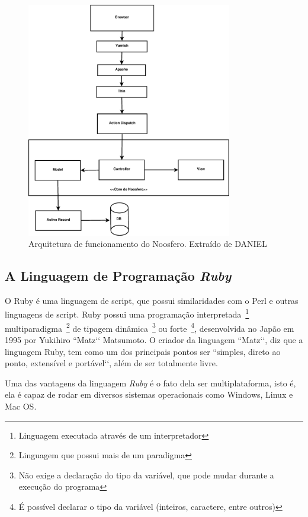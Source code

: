 \graphicspath{{figuras/}}
\begin{figure}[H]
\centering
\includegraphics[width=0.8\textwidth]{noosfero_architeture}
\caption{Arquitetura de funcionamento do Noosfero. Extraído de DANIEL}
\label{fig:arquiteturaror}
\end{figure}

\subsection{A Linguagem de Programação \textit{Ruby}}
\label{sec:linguagemruby}

O Ruby é uma linguagem de script, que possui similaridades com o Perl e outras linguagens de script. Ruby possui uma programação interpretada~\footnote{Linguagem executada através de um interpretador} multiparadigma~\footnote{Linguagem que possui mais de um paradigma} de tipagem dinâmica~\footnote{Não exige a declaração do tipo da variável, que pode mudar durante a execução do programa} ou forte~\footnote{É possível declarar o tipo da variável (inteiros, caractere, entre outros)}, desenvolvida no Japão em 1995 por Yukihiro ``Matz‘‘ Matsumoto. O criador da linguagem ``Matz‘‘, diz que a linguagem Ruby, tem como um dos principais pontos ser ``simples, direto ao ponto, extensível e portável‘‘, além de ser totalmente livre.

Uma das vantagens da linguagem \textit{Ruby} é o fato dela ser multiplataforma, isto é, ela é capaz de rodar em diversos sistemas operacionais como Windows, Linux e Mac OS.

